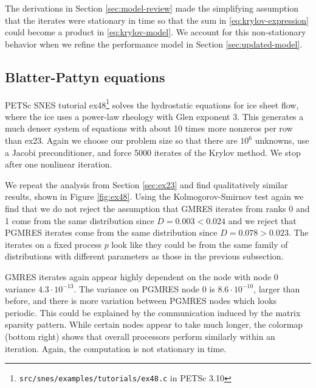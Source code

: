 \documentclass[sigconf]{acmart}
\begin{document}
The derivations in Section \ref{sec:model-review} made the simplifying assumption that the iterates were stationary in time so that the sum in \eqref{eq:krylov-expression} could become a product in \eqref{eq:krylov-model}. We account for this non-stationary behavior when we refine the performance model in Section \ref{sec:updated-model}.



\subsection{Blatter-Pattyn equations}
PETSc SNES tutorial ex48\footnote{\texttt{src/snes/examples/tutorials/ex48.c} in PETSc 3.10} solves the hydrostatic equations for ice sheet flow, where the ice uses a power-law rheology with Glen exponent 3. This generates a much denser system of equations with about 10 times more nonzeros per row than ex23. Again we choose our problem size so that there are $10^6$ unknowns, use a Jacobi preconditioner, and force 5000 iterates of the Krylov method. We stop after one nonlinear iteration. 

We repeat the analysis from Section \ref{sec:ex23} and find qualitatively similar results, shown in Figure \ref{fig:ex48}. Using the Kolmogorov-Smirnov test again we find that we do not reject the assumption that GMRES iterates from ranks 0 and 1 come from the same distribution since $D = 0.003 < 0.024$ and we reject that PGMRES iterates come from the same distribution since $D = 0.078 > 0.023$.
The iterates on a fixed process $p$ look like they could be from the same family of distributions with different parameters as those in the previous subsection. 

GMRES iterates again appear highly dependent on the node with node 0 variance $4.3\cdot10^{-13}$. The variance on PGMRES node 0 is $8.6\cdot10^{-10}$, larger than before, and there is more variation between PGMRES nodes which looks periodic. This could be explained by the communication induced by the matrix sparsity pattern. While certain nodes appear to take much longer, the colormap (bottom right) shows that overall processors perform similarly within an iteration. Again, the computation is  not stationary in time. 
\end{document}

